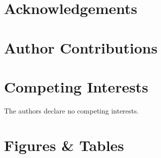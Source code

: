 \documentclass[fleqn,10pt]{wlscirep}
\begin{document}

\section*{Acknowledgements}


\section*{Author Contributions}


\section*{Competing Interests}
The authors declare no competing interests.


\section*{Figures \& Tables}
\end{document}
